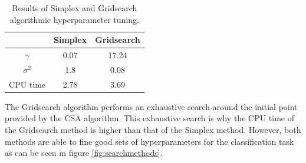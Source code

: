 \documentclass{article}
\begin{document}
            \begin{table}[]
            
            \centering
            \begin{tabular}{|c|c|c|}
            \hline
            \multicolumn{1}{|l|}{} & \textbf{Simplex} & \textbf{Gridsearch} \\ \hline
            $\gamma$               & 0.07             & 17.24               \\ \hline
            $\sigma^2$             & 1.8              & 0.08                \\ \hline
            CPU time               & 2.78             & 3.69                \\ \hline
            \end{tabular}
            \caption{Results of Simplex and Gridsearch algorithmic hyperparameter tuning.}
            \label{tab:gridsimp}
            \end{table}
            
            The Gridsearch algorithm performs an exhaustive search around the initial point provided by the CSA algorithm. This exhaustive search is why the CPU time of the Gridsearch method is higher than that of the Simplex method. However, both methods are able to fine good sets of hyperparameters for the classification task as can be seen in figure \ref{fig:searchmethods}. 
            
\end{document}
